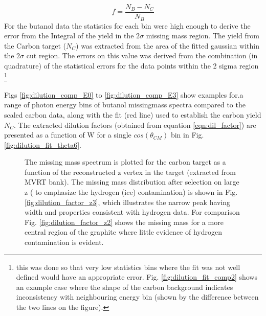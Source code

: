 \begin{equation} \label{eqn:dil_factor}
  f = \frac{N_B - N_C}{N_B}
\end{equation}
For the butanol data the statistics for each bin were high enough to derive the error from the Integral of the yield in the $2\sigma$ missing mass region.  The yield from the Carbon target ($N_C$) was extracted from the area of the fitted gaussian within the $2 \sigma$ cut region. The errors on this value was derived from the combination (in quadrature) of the statistical errors for the data points within the 2 sigma region \footnote{this was done so that very low statistics bins where the fit was not well defined would have an appropriate error. Fig. \ref{fig:dilution_fit_comp2} shows an example case where the shape of the carbon background indicates inconsistency with neighbouring energy bin (shown by the difference between the two lines on the figure). }

Figs \ref{fig:dilution_comp_E0} to \ref{fig:dilution_comp_E3} show examples for.a range of photon energy bins  of butanol missingmass spectra  compared to the scaled carbon data, along with the fit (red line) used to establish the carbon yield $N_C$. The extracted dilution factors (obtained from equation \ref{eqn:dil_factor}) are presented as a function of W for a single $cos(\theta_{CM})$ bin in Fig. \ref{fig:dilution_fit_theta6}.
 
\begin{figure}[H]
  \begin{center}
    \qquad
    \qquad

    \caption{The missing mass spectrum is plotted for the carbon target as a function of the reconstructed z vertex in the target (extracted from MVRT bank). The missing mass distribution after selection on large z ( to emphasize the hydrogen (ice) contamination) is shown in Fig. \ref{fig:dilution_factor_z3}, which illustrates the narrow peak having width and properties consistent with hydrogen data. For comparison Fig.  \ref{fig:dilution_factor_z2}  shows the missing mass for a more central region of the graphite where little evidence of hydrogen contamination is evident.}
    \label{fig:dilution_factor_z0}
  \end{center}
\end{figure}


